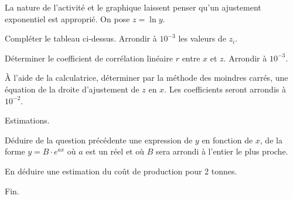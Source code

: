 \documentclass[a4paper,12pt]{scrartcl}
\begin{document}
\question{}
La nature de l'activité et le graphique laissent penser qu'un ajustement exponentiel est approprié. On pose $z = \ln y$.

\subquestion{}
Compléter le tableau ci-dessus.
Arrondir à $10^{-3}$ les valeurs de $z_i$.

\subquestion{}
Déterminer le coefficient de corrélation linéaire $r$ entre $x$ et $z$. Arrondir à $10^{-3}$.

\subquestion{}\label{question}
À l'aide de la calculatrice, déterminer par la méthode des moindres carrés, une équation de la droite d'ajustement de $z$
en $x$. Les coefficients seront arrondis à $10^{-2}$.

\question{}
Estimations.

\subquestion{}
Déduire de la question précédente une expression de $y$ en fonction de $x$, de la forme $y = B \cdot e^{ax}$ où $a$ est un réel et où $B$ sera arrondi à l'entier le plus proche.

\subquestion{}
En déduire une estimation du coût de production pour 2 tonnes.


\trait

\begin{center}
Fin.
\end{center}
\end{document}
